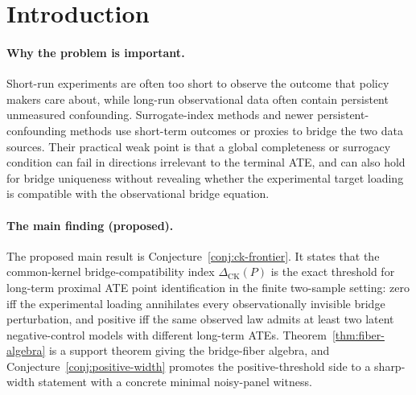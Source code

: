 \documentclass[11pt]{article}
\theoremstyle{definition}
\theoremstyle{plain}
\theoremstyle{remark}
\begin{document}
\begin{abstract}
Long-term causal inference increasingly uses short-run experimental proxies
and long-run observational outcomes to identify terminal treatment effects
under persistent unobserved confounding.  Existing proximal and surrogate-index
results give sufficient bridge, surrogacy, or sequential proxy conditions, but
do not state a sharp observable frontier for when the early experimental proxy
panel spans exactly the confounding direction needed for the terminal outcome.
This proposal introduces the common-kernel bridge-compatibility index
\(\Delta_{\mathrm{CK}}(P)\), the norm of the experimental ATE loading projected
onto the observational bridge null space.  The flagship conjecture is that,
under finite bridge realization, \(\Delta_{\mathrm{CK}}(P)=0\) is necessary and
sufficient for point identification of the long-term ATE, while positive
\(\Delta_{\mathrm{CK}}(P)\) produces a sharp non-singleton bridge envelope.
Resolving the conjecture would turn completeness from an untestable global
condition into a target-specific compatibility report for proximal surrogate
analyses.
\end{abstract}

\section{Introduction}
\paragraph{Why the problem is important.}
Short-run experiments are often too short to observe the outcome that policy
makers care about, while long-run observational data often contain persistent
unmeasured confounding.  Surrogate-index methods and newer persistent-confounding
methods use short-term outcomes or proxies to bridge the two data sources.
Their practical weak point is that a global completeness or surrogacy condition
can fail in directions irrelevant to the terminal ATE, and can also hold for
bridge uniqueness without revealing whether the experimental target loading is
compatible with the observational bridge equation.

\paragraph{The main finding (proposed).}
The proposed main result is Conjecture~\ref{conj:ck-frontier}.  It states that
the common-kernel bridge-compatibility index
\(\Delta_{\mathrm{CK}}(P)\) is the exact threshold for long-term proximal ATE
point identification in the finite two-sample setting: zero iff the experimental
loading annihilates every observationally invisible bridge perturbation, and
positive iff the same observed law admits at least two latent negative-control
models with different long-term ATEs.  Theorem~\ref{thm:fiber-algebra} is a
support theorem giving the bridge-fiber algebra, and
Conjecture~\ref{conj:positive-width} promotes the positive-threshold side to a
sharp-width statement with a concrete minimal noisy-panel witness.
\end{document}
